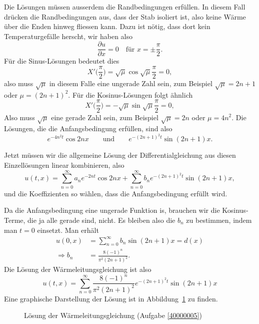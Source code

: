 \begin{loesung}
Die Lösungen müssen ausserdem die Randbedingungen erfüllen.
In diesem Fall drücken die Randbedingungen aus, dass der Stab isoliert ist,
also keine Wärme über die Enden hinweg fliessen kann. Dazu ist nötig,
dass dort kein Temperaturgefälle herscht, wir haben also
\[\frac{\partial u}{\partial x}=0\quad\text{für $x=\pm\frac{\pi}2$}.\]
Für die Sinus-Lösungen bedeutet dies
\[
X'\biggl(\frac{\pi}2\biggr)=\sqrt{\mu}\cos \sqrt{\mu}\frac{\pi}2=0,
\]
also muss $\sqrt{\mu}$ in diesem Falle eine ungerade Zahl sein,
zum Beispiel $\sqrt{\mu}=2n+1$ oder
$\mu=(2n+1)^2$.
Für die Kosinus-Lösungen folgt ähnlich
\[
X'\biggl(\frac{\pi}2\biggr)=-\sqrt{\mu}\sin\sqrt{\mu}\frac{\pi}2=0,
\]
Also muss $\sqrt{\mu}$ eine gerade Zahl sein, zum Beispiel $\sqrt{\mu}=2n$ oder
$\mu=4n^2$.
Die Lösungen, die die Anfangsbedingung
erfüllen, sind also
\[
e^{-4n^2t}\cos 2nx\qquad\text{und}\qquad e^{-(2n+1)^2t}\sin(2n+1)x.
\]

Jetzt müssen wir die allgemeine Lösung der Differentialgleichung aus
diesen Einzellösungen linear kombinieren, also
\[
u(t,x)=
\sum_{n=0}^\infty a_ne^{-2nt}\cos 2nx +\sum_{n=0}^\infty b_n e^{-(2n+1)^2t}\sin(2n+1)x,
\]
und die Koeffizienten so wählen, dass die Anfangsbedingung erfüllt wird.

Da die Anfangsbedingung eine ungerade Funktion is, brauchen wir die Kosinus-Terme,
die ja alle gerade sind, nicht. Es bleiben also die $b_n$ zu bestimmen, indem
man $t=0$ einsetzt. Man erhält
\begin{align*}
u(0,x)&=\sum_{n=0}^\infty b_n\sin(2n+1)x=d(x)
\\
\Rightarrow
b_n&=\frac{8(-1)^n}{\pi^2(2n+1)^2}.
\end{align*}
Die Lösung der Wärmeleitungsgleichung ist also
\[
u(t,x)=
\sum_{n=0}^\infty \frac{8(-1)^n}{\pi^2(2n+1)^2}e^{-(2n+1)^2t}\sin(2n+1)x
\]
Eine graphische Darstellung der Lösung ist in Abbildung~\ref{40000005:bild}
zu finden.
\begin{figure}
\begin{center}
\end{center}
\caption{Lösung der Wärmeleitungsgleichung (Aufgabe \ref{40000005})\label{40000005:bild}}
\end{figure}
\end{loesung}
